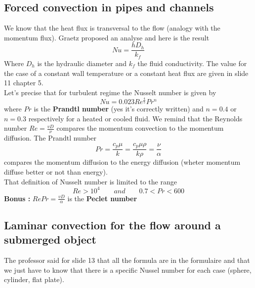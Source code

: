 	\subsection{Forced convection in pipes and channels}
	\label{subsec:5.3.3}
		We know that the heat flux is transversal to the flow (analogy with the momentum flux). Graetz proposed an analyse and here is the result
		\begin{equation}
			Nu = \frac{hD_h}{k_f}
		\end{equation}		
		Where $D_h$ is the hydraulic diameter and $k_f$ the fluid conductivity. The value for the case of a constant wall temperature or a constant heat flux are given in slide 11 chapter 5. \\
	Let's precise that for turbulent regime the Nusselt number is given by 
	\begin{equation}
	Nu = 0.023 Re^{\frac{4}{5}}Pr^n
\end{equation}		
	where $Pr$ is the \textbf{Prandtl number} (yes it's correctly written) and $n=0.4$ or $n=0.3$ respectively for a heated or cooled fluid. We remind that the Reynolds number $Re = \frac{vD}{\nu}$ compares the momentum convection to the momentum diffusion. The Prandtl number 
	\begin{equation}
			Pr = \frac{c_p \mu}{k} = \frac{c_p \mu \rho}{k\rho} = \frac{\nu}{\alpha}
	\end{equation}
	compares the momentum diffusion to the energy diffusion (wheter momentum diffuse better or not than energy). \\
	That definition of Nusselt number is limited to the range 
	\begin{equation}
		Re > 10^4 \qquad and \qquad 0.7 < Pr < 600
	\end{equation}
	\textbf{Bonus :} $RePr = \frac{vD}{\alpha}$ is the \textbf{Peclet number}

	\subsection{Laminar convection for the flow around a submerged object}
		The professor said for slide 13 that all the formula are in the formulaire and that we just have to know that there is a specific Nussel number for each case (sphere, cylinder, flat plate).
		
